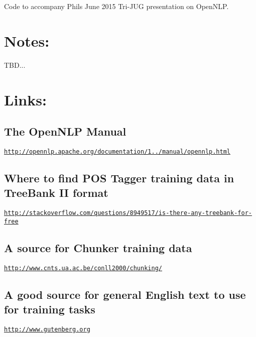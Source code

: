 Code to accompany Phil\textquotesingle{}s June 2015 Tri-\/\+J\+UG presentation on Open\+N\+LP.

\section*{Notes\+:}

T\+BD...

\section*{Links\+:}

\subsection*{The Open\+N\+LP Manual}


\begin{DoxyItemize}
\item \href{http://opennlp.apache.org/documentation/1.5.3/manual/opennlp.html}{\tt http\+://opennlp.\+apache.\+org/documentation/1../manual/opennlp.\+html}
\end{DoxyItemize}

\subsection*{Where to find P\+OS Tagger training data in Tree\+Bank II format}


\begin{DoxyItemize}
\item \href{http://stackoverflow.com/questions/8949517/is-there-any-treebank-for-free}{\tt http\+://stackoverflow.\+com/questions/8949517/is-\/there-\/any-\/treebank-\/for-\/free}
\end{DoxyItemize}

\subsection*{A source for Chunker training data}


\begin{DoxyItemize}
\item \href{http://www.cnts.ua.ac.be/conll2000/chunking/}{\tt http\+://www.\+cnts.\+ua.\+ac.\+be/conll2000/chunking/}
\end{DoxyItemize}

\subsection*{A good source for general English text to use for training tasks}

\href{http://www.gutenberg.org}{\tt http\+://www.\+gutenberg.\+org} 